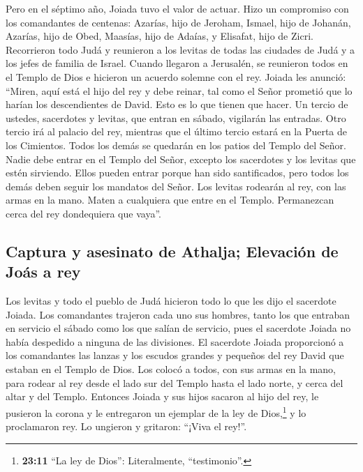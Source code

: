  Pero en el séptimo año, Joiada tuvo el valor de actuar.
Hizo un compromiso con los comandantes de centenas: Azarías, hijo de
Jeroham, Ismael, hijo de Johanán, Azarías, hijo de Obed, Maasías, hijo
de Adaías, y Elisafat, hijo de Zicri.  Recorrieron todo
Judá y reunieron a los levitas de todas las ciudades de Judá y a los
jefes de familia de Israel. Cuando llegaron a Jerusalén, 
se reunieron todos en el Templo de Dios e hicieron un acuerdo solemne
con el rey. Joiada les anunció: ``Miren, aquí está el hijo del rey y
debe reinar, tal como el Señor prometió que lo harían los descendientes
de David.  Esto es lo que tienen que hacer. Un tercio de
ustedes, sacerdotes y levitas, que entran en sábado, vigilarán las
entradas.  Otro tercio irá al palacio del rey, mientras
que el último tercio estará en la Puerta de los Cimientos. Todos los
demás se quedarán en los patios del Templo del Señor. 
Nadie debe entrar en el Templo del Señor, excepto los sacerdotes y los
levitas que estén sirviendo. Ellos pueden entrar porque han sido
santificados, pero todos los demás deben seguir los mandatos del Señor.
 Los levitas rodearán al rey, con las armas en la mano.
Maten a cualquiera que entre en el Templo. Permanezcan cerca del rey
dondequiera que vaya''.

\hypertarget{captura-y-asesinato-de-athalja-elevaciuxf3n-de-jouxe1s-a-rey}{%
\subsection{Captura y asesinato de Athalja; Elevación de Joás a
rey}\label{captura-y-asesinato-de-athalja-elevaciuxf3n-de-jouxe1s-a-rey}}

 Los levitas y todo el pueblo de Judá hicieron todo lo que
les dijo el sacerdote Joiada. Los comandantes trajeron cada uno sus
hombres, tanto los que entraban en servicio el sábado como los que
salían de servicio, pues el sacerdote Joiada no había despedido a
ninguna de las divisiones.  El sacerdote Joiada
proporcionó a los comandantes las lanzas y los escudos grandes y
pequeños del rey David que estaban en el Templo de Dios. 
Los colocó a todos, con sus armas en la mano, para rodear al rey desde
el lado sur del Templo hasta el lado norte, y cerca del altar y del
Templo.  Entonces Joiada y sus hijos sacaron al hijo del
rey, le pusieron la corona y le entregaron un ejemplar de la ley de
Dios,\footnote{\textbf{23:11} ``La ley de Dios'': Literalmente,
  ``testimonio''.} y lo proclamaron rey. Lo ungieron y gritaron: ``¡Viva
el rey!''.

